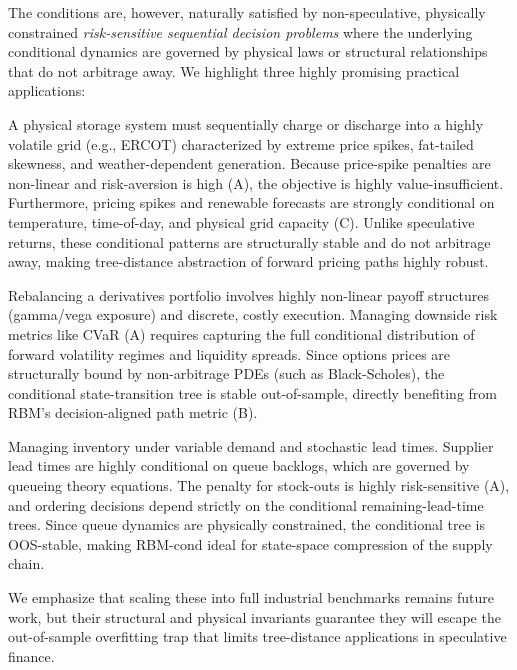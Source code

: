 \documentclass[11pt]{article}
\begin{document}
The conditions are, however, naturally satisfied by non-speculative, physically constrained \emph{risk-sensitive sequential decision problems} where the underlying conditional dynamics are governed by physical laws or structural relationships that do not arbitrage away. We highlight three highly promising practical applications:

\begin{description}[leftmargin=1.2em,nosep]
\item[1. Power Grid Battery Dispatch:] A physical storage system must sequentially charge or discharge into a highly volatile grid (e.g., ERCOT) characterized by extreme price spikes, fat-tailed skewness, and weather-dependent generation. Because price-spike penalties are non-linear and risk-aversion is high (A), the objective is highly value-insufficient. Furthermore, pricing spikes and renewable forecasts are strongly conditional on temperature, time-of-day, and physical grid capacity (C). Unlike speculative returns, these conditional patterns are structurally stable and do not arbitrage away, making tree-distance abstraction of forward pricing paths highly robust.
\item[2. Options Portfolio Hedging under Transaction Costs:] Rebalancing a derivatives portfolio involves highly non-linear payoff structures (gamma/vega exposure) and discrete, costly execution. Managing downside risk metrics like CVaR (A) requires capturing the full conditional distribution of forward volatility regimes and liquidity spreads. Since options prices are structurally bound by non-arbitrage PDEs (such as Black-Scholes), the conditional state-transition tree is stable out-of-sample, directly benefiting from RBM's decision-aligned path metric (B).
\item[3. Supply Chain Inventory with Capacity Queues:] Managing inventory under variable demand and stochastic lead times. Supplier lead times are highly conditional on queue backlogs, which are governed by queueing theory equations. The penalty for stock-outs is highly risk-sensitive (A), and ordering decisions depend strictly on the conditional remaining-lead-time trees. Since queue dynamics are physically constrained, the conditional tree is OOS-stable, making RBM-cond ideal for state-space compression of the supply chain.
\end{description}

We emphasize that scaling these into full industrial benchmarks remains future work, but their structural and physical invariants guarantee they will escape the out-of-sample overfitting trap that limits tree-distance applications in speculative finance.
\end{document}

